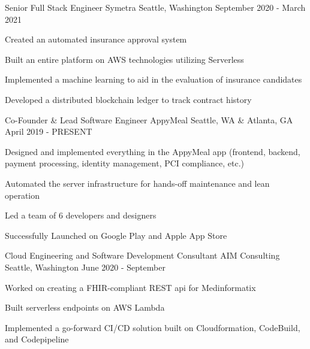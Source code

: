 \begin{cventries}

\cventry
{Senior Full Stack Engineer} %
{Symetra} %
{Seattle, Washington} %
{September 2020 - March 2021} %
{ %
\begin{cvitems}
\item {Created an automated insurance approval system}
\item {Built an entire platform on AWS technologies utilizing Serverless}
\item {Implemented a machine learning to aid in the evaluation of insurance candidates}
\item {Developed a distributed blockchain ledger to track contract history}
\end{cvitems}
}


\cventry
{Co-Founder \& Lead Software Engineer} %
{AppyMeal} %
{Seattle, WA \& Atlanta, GA} %
{April 2019 - PRESENT} %
{ %
\begin{cvitems}
\item {Designed and implemented everything in the AppyMeal app (frontend, backend, payment processing, \newline identity management, PCI compliance, etc.)}
\item {Automated the server infrastructure for hands-off maintenance and lean operation}
\item {Led a team of 6 developers and designers}
\item {Successfully Launched on Google Play and Apple App Store}
\end{cvitems}
}


\cventry
{Cloud Engineering and Software Development Consultant} %
{AIM Consulting} %
{Seattle, Washington} %
{June 2020 - September} %
{ %
\begin{cvitems}
\item {Worked on creating a FHIR-compliant REST api for Medinformatix}
\item {Built serverless endpoints on AWS Lambda}
\item {Implemented a go-forward CI/CD solution built on Cloudformation, CodeBuild, and Codepipeline}
\end{cvitems}
}


\end{cventries}
